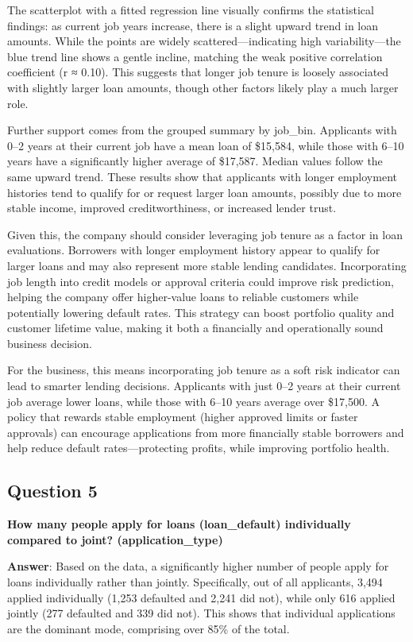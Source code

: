 \documentclass[
]{article}
\begin{document}
The scatterplot with a fitted regression line visually confirms the
statistical findings: as current job years increase, there is a slight
upward trend in loan amounts. While the points are widely
scattered---indicating high variability---the blue trend line shows a
gentle incline, matching the weak positive correlation coefficient (r ≈
0.10). This suggests that longer job tenure is loosely associated with
slightly larger loan amounts, though other factors likely play a much
larger role.

Further support comes from the grouped summary by job\_bin. Applicants
with 0--2 years at their current job have a mean loan of \$15,584, while
those with 6--10 years have a significantly higher average of \$17,587.
Median values follow the same upward trend. These results show that
applicants with longer employment histories tend to qualify for or
request larger loan amounts, possibly due to more stable income,
improved creditworthiness, or increased lender trust.

Given this, the company should consider leveraging job tenure as a
factor in loan evaluations. Borrowers with longer employment history
appear to qualify for larger loans and may also represent more stable
lending candidates. Incorporating job length into credit models or
approval criteria could improve risk prediction, helping the company
offer higher-value loans to reliable customers while potentially
lowering default rates. This strategy can boost portfolio quality and
customer lifetime value, making it both a financially and operationally
sound business decision.

For the business, this means incorporating job tenure as a soft risk
indicator can lead to smarter lending decisions. Applicants with just
0--2 years at their current job average lower loans, while those with
6--10 years average over \$17,500. A policy that rewards stable
employment (higher approved limits or faster approvals) can encourage
applications from more financially stable borrowers and help reduce
default rates---protecting profits, while improving portfolio health.

\subsection{Question 5}\label{question-5}

\textbf{How many people apply for loans (loan\_default) individually
compared to joint? (application\_type)}

\textbf{Answer}: Based on the data, a significantly higher number of
people apply for loans individually rather than jointly. Specifically,
out of all applicants, 3,494 applied individually (1,253 defaulted and
2,241 did not), while only 616 applied jointly (277 defaulted and 339
did not). This shows that individual applications are the dominant mode,
comprising over 85\% of the total.
\end{document}
